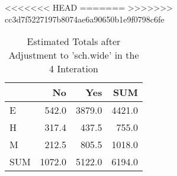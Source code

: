 <<<<<<< HEAD
=======
>>>>>>> cc3d7f5227197b8074ae6a90650b1e9f0798c6fe
\begin{table}[ht]
\centering
\caption{Estimated Totals after Adjustment to 'sch.wide' in the 4 Interation} 
\begin{tabular}{l|rr|r}
  & No & Yes & SUM \\ 
  \hline
E & 542.0 & 3879.0 & 4421.0 \\ 
  H & 317.4 & 437.5 & 755.0 \\ 
  M & 212.5 & 805.5 & 1018.0 \\ 
   \hline
SUM & 1072.0 & 5122.0 & 6194.0 \\ 
  \end{tabular}
\end{table}
